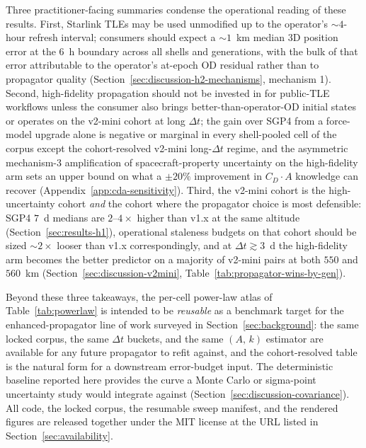 \documentclass[10pt, letterpaper]{article}
\begin{document}
Three practitioner-facing summaries condense the operational reading
of these results. First, Starlink TLEs may be used unmodified up to
the operator's $\sim 4$-hour refresh interval; consumers should
expect a $\sim 1$~km median 3D position error at the $6$~h boundary
across all shells and generations, with the bulk of that error
attributable to the operator's at-epoch OD residual rather than to
propagator quality
(Section~\ref{sec:discussion-h2-mechanisms}, mechanism 1). Second,
high-fidelity propagation should not be invested in for public-TLE
workflows unless the consumer also brings better-than-operator-OD
initial states or operates on the v2-mini cohort at long
$\Delta t$; the gain over SGP4 from a force-model upgrade alone is
negative or marginal in every shell-pooled cell of the corpus
except the cohort-resolved v2-mini long-$\Delta t$ regime, and the
asymmetric mechanism-3 amplification of spacecraft-property
uncertainty on the high-fidelity arm sets an upper bound on what a
$\pm 20\%$ improvement in $C_{D} \cdot A$ knowledge can recover
(Appendix~\ref{app:cda-sensitivity}). Third, the v2-mini cohort is
the high-uncertainty cohort \emph{and} the cohort where the
propagator choice is most defensible: SGP4 $7$~d medians are
$2$--$4\times$ higher than v1.x at the same altitude
(Section~\ref{sec:results-h1}), operational staleness budgets on
that cohort should be sized $\sim 2\times$ looser than v1.x
correspondingly, and at $\Delta t \gtrsim 3$~d the high-fidelity
arm becomes the better predictor on a majority of v2-mini pairs at
both $550$ and $560$~km
(Section~\ref{sec:discussion-v2mini},
Table~\ref{tab:propagator-wins-by-gen}).

Beyond these three takeaways, the per-cell power-law atlas of
Table~\ref{tab:powerlaw} is intended to be \emph{reusable} as a
benchmark target for the enhanced-propagator line of work surveyed
in Section~\ref{sec:background}: the same locked corpus, the same
$\Delta t$ buckets, and the same $(A,\,k)$ estimator are available
for any future propagator to refit against, and the cohort-resolved
table is the natural form for a downstream error-budget input. The
deterministic baseline reported here provides the curve a Monte
Carlo or sigma-point uncertainty study would integrate against
(Section~\ref{sec:discussion-covariance}). All code, the locked
corpus, the resumable sweep manifest, and the rendered figures are
released together under the MIT license at the URL listed in
Section~\ref{sec:availability}.

\appendix
\end{document}
